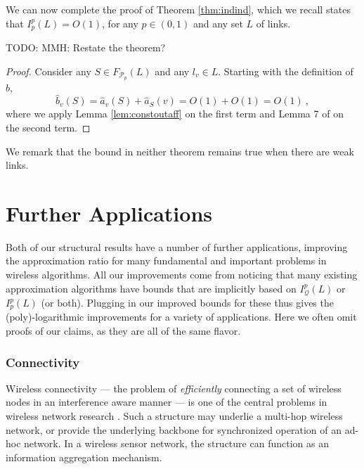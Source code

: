 \documentclass[11pt]{amsart}
\newcommand{\cal}[1]{\mathcal{#1}}
\newcommand{\todo}[1]{{\begin{small}\sffamily \color{gray}TODO:  #1 \end{small}}}
\def\calP{{\cal P}}
\def\calQ{{\cal Q}}
\def\calP{{\cal P}}   \def\calM{{\cal M}}   \def\calU{{\cal U}}   \newcommand{\PCopt}{\overline{OPT}}
\newcommand{\powp}{\calP_p}
\begin{document}
\noindent We can now complete the proof of Theorem \ref{thm:indind},
which we recall states that $I_p^p(L) = O(1)$, for any $p \in (0,1)$ and any set $L$ of links.
\todo{MMH: Restate the theorem?}
\begin{proof}
Consider any $S \in F_{\powp}(L)$ and any $l_v \in L$. 
Starting with the definition of $\hat{b}$,
\[ \hat b_v(S) = \hat{a}_v(S) + \hat{a}_S(v) = O(1) + O(1) = O(1)\ , \]
where we apply Lemma \ref{lem:constoutaff} on the first term and Lemma 7 of \cite{KV10} on the second term.
\end{proof}


We remark that the bound in neither theorem remains true when there are weak links.


\iffalse
Effectiveness is closely related to \emph{inductive independence} in
weighted graphs \cite{DBLP:conf/spaa/HoeferKV11}, if we replace the mention of
``PC-feasibility'' in the definition to $\powp$-feasibility.
The difference is that ``independence'' is defined with
respect to $\powp$, while effectiveness compares the solution obtained
with power $\powp$ with an optimum solution that uses arbitrary power
assignment.
\fi





\section{Further Applications}
\label{sec:fapplications}

Both of our structural
results have a number of further applications, improving the approximation ratio for many fundamental and important
problems in wireless algorithms. All our improvements come from noticing
that many existing approximation algorithms have bounds that are implicitly 
based on $I^p_{\calQ}(L)$ or $I^p_p(L)$ (or both).
Plugging in our improved bounds for these thus gives the (poly)-logarithmic
improvements for a variety of applications. Here we often omit 
proofs of our claims, as they are all of the same flavor.

\subsubsection*{Connectivity}
Wireless connectivity --- the problem of \emph{efficiently} connecting a set of wireless nodes in an interference aware manner --- is one of the central problems in wireless network research \cite{HM12}. Such a structure may underlie a multi-hop wireless network, or
provide the underlying backbone for synchronized operation of an ad-hoc network. In a wireless sensor
network, the structure can function as an information aggregation mechanism.
\end{document}
